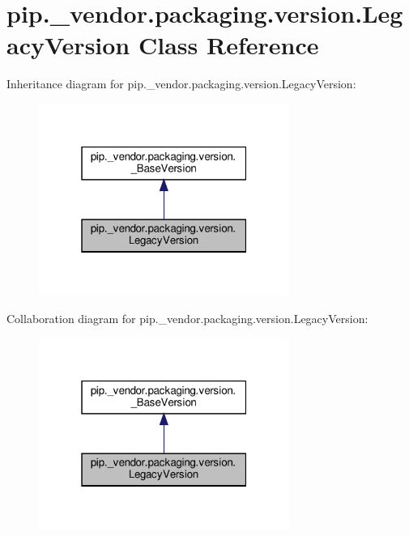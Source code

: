 \hypertarget{classpip_1_1__vendor_1_1packaging_1_1version_1_1LegacyVersion}{}\section{pip.\+\_\+vendor.\+packaging.\+version.\+Legacy\+Version Class Reference}
\label{classpip_1_1__vendor_1_1packaging_1_1version_1_1LegacyVersion}


Inheritance diagram for pip.\+\_\+vendor.\+packaging.\+version.\+Legacy\+Version\+:
\nopagebreak
\begin{figure}[H]
\begin{center}
\leavevmode
\includegraphics[width=232pt]{classpip_1_1__vendor_1_1packaging_1_1version_1_1LegacyVersion__inherit__graph}
\end{center}
\end{figure}


Collaboration diagram for pip.\+\_\+vendor.\+packaging.\+version.\+Legacy\+Version\+:
\nopagebreak
\begin{figure}[H]
\begin{center}
\leavevmode
\includegraphics[width=232pt]{classpip_1_1__vendor_1_1packaging_1_1version_1_1LegacyVersion__coll__graph}
\end{center}
\end{figure}
